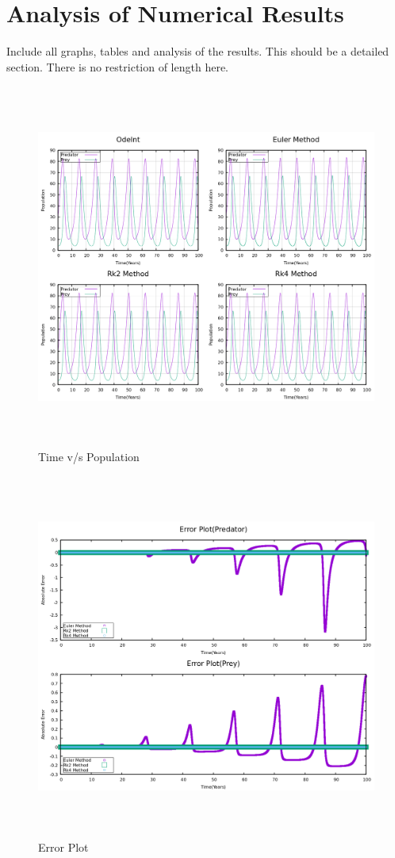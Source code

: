 \documentclass[12pt]{article}
\begin{document}
\section{Analysis of Numerical Results}
Include all graphs, tables and analysis of the results. This should be a detailed section. There is no restriction of length here.
\newpage
\begin{figure}[h]
    \centering
    \includegraphics[width=15cm,height=12cm]{time_vs_population.png}
\caption{Time v/s Population}
\end{figure}

\begin{figure}[h]
    \centering
    \includegraphics[width=15cm,height=12cm]{error_plot.png}
\caption{Error Plot }
\end{figure}
\newpage
\end{document}
